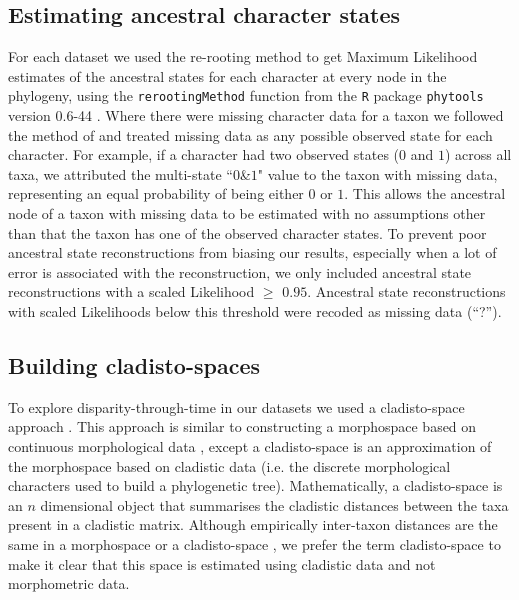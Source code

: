 \documentclass[12pt,a4paper]{article}
\begin{document}
\subsection{Estimating ancestral character states}
\label{ace}
For each dataset we used the re-rooting method \citep{Yang01121995,Garland2000} to get Maximum Likelihood estimates of the ancestral states for each character at every node in the phylogeny, using the \texttt{rerootingMethod} function from the \texttt{R} package \texttt{phytools} version 0.6-44 \citep{phytools,R}.
Where there were missing character data for a taxon we followed the method of \cite{Claddis} and treated missing data as any possible observed state for each character.
For example, if a character had two observed states ($0$ and $1$) across all taxa, we attributed the multi-state ``$0$\&$1$" value to the taxon with missing data, representing an equal probability of being either $0$ or $1$.
This allows the ancestral node of a taxon with missing data to be estimated with no assumptions other than that the taxon has one of the observed character states.
To prevent poor ancestral state reconstructions from biasing our results, especially when a lot of error is associated with the reconstruction, we only included ancestral state reconstructions with a scaled Likelihood $\geq$ $0.95$.
Ancestral state reconstructions with scaled Likelihoods below this threshold were recoded as missing data (``?'').

\subsection{Building cladisto-spaces} 
To explore disparity-through-time in our datasets we used a cladisto-space approach \citep[e.g.][]{Foote01071994,Foote29111996,Wesley-Hunt2005,Brusatte12092008,friedmanexplosive2010,toljagictriassic-jurassic2013,Hughes20082013}.
This approach is similar to constructing a morphospace based on continuous morphological data \citep[e.g.][]{friedmanexplosive2010}, except a cladisto-space is an approximation of the morphospace based on cladistic data (i.e. the discrete morphological characters used to build a phylogenetic tree).
Mathematically, a cladisto-space is an $n$ dimensional object that summarises the cladistic distances between the taxa present in a cladistic matrix.
Although empirically inter-taxon distances are the same in a morphospace or a cladisto-space \citep{foth2012different,hetherington2015cladistic}, we prefer the term cladisto-space to make it clear that this space is estimated using cladistic data and not morphometric data.
\end{document}
